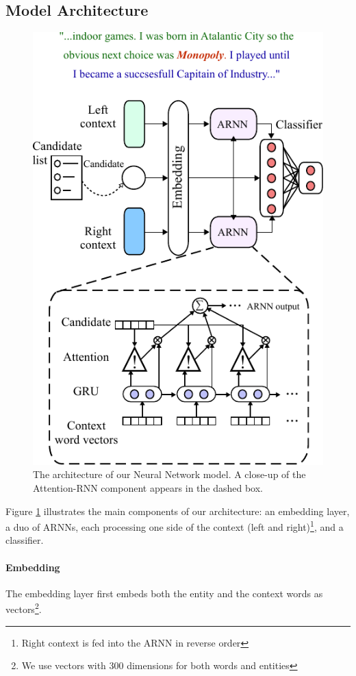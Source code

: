 \documentclass[11pt]{article}
\begin{document}
	\subsection{Model Architecture}
	
	\begin{figure}[t]
		\centering
		\includegraphics[scale=0.92]{diagrams/model_color_v4.pdf}
		\caption{The architecture of our Neural Network model. A close-up of the Attention-RNN component appears in the dashed box.}
		\label{fig:arnn}
	\end{figure}	
	
	Figure \ref{fig:arnn} illustrates the main components of our architecture: an embedding layer, a duo of ARNNs, each processing one side of the context (left and right)\footnote{Right context is fed into the ARNN in reverse order}, and a classifier. 
	
	
	\paragraph{Embedding}
	The embedding layer first embeds both the entity and the context words as vectors\footnote{We use vectors with 300 dimensions for both words and entities}. 
	
\end{document}
